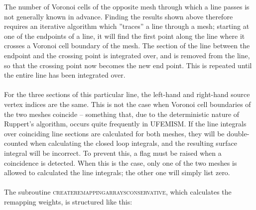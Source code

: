 \documentclass{article}
\begin{document}
The number of Voronoi cells of the opposite mesh through which a line passes is not generally known in advance. Finding the results shown above therefore requires an iterative algorithm which ''traces'' a line through a mesh; starting at one of the endpoints of a line, it will find the first point along the line where it crosses a Voronoi cell boundary of the mesh. The section of the line between the endpoint and the crossing point is integrated over, and is removed from the line, so that the crossing point now becomes the new end point. This is repeated until the entire line has been integrated over.\\
\\
For the three sections of this particular line, the left-hand and right-hand source vertex indices are the same. This is not the case when Voronoi cell boundaries of the two meshes coincide – something that, due to the deterministic nature of Ruppert’s algorithm, occurs quite frequently in UFEMISM. If the line integrals over coinciding line sections are calculated for both meshes, they will be double-counted when calculating the closed loop integrals, and the resulting surface integral will be incorrect. To prevent this, a flag must be raised when a coincidence is detected. When this is the case, only one of the two meshes is allowed to calculated the line integrals; the other one will simply list zero.\\
\\
The subroutine \textsc{create\textunderscore remapping\textunderscore arrays\textunderscore conservative}, which calculates the remapping weights, is structured like this:
\hrulefill
\end{document}
